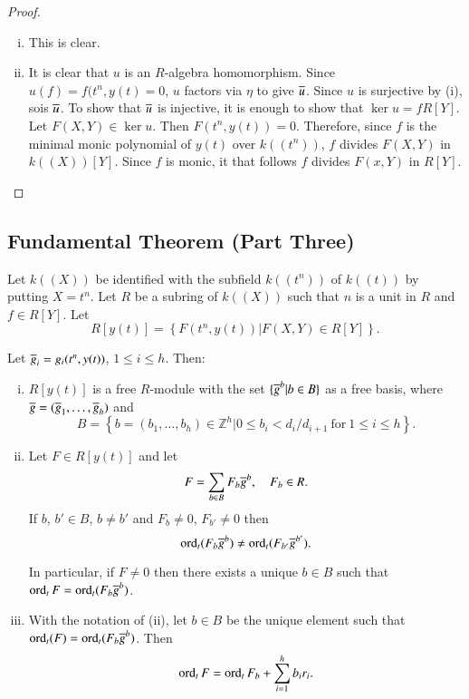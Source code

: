 \begin{proof}
  ~
\begin{enumerate}[(i)]
\item This is clear.
\item It is clear that $u$ is an $R$-algebra homomorphism. Since $u(f) = f(t^n, y(t)=0$, $u$ factors via $\eta$ to give $\overline{u}$. Since $u$ is surjective by (i), so\pageoriginale is $\overline{u}$. To show that $\overline{u}$ is injective, it is enough to show that $\ker u = fR[Y]$. Let $F(X, Y) \in \ker u$. Then $F(t^n, y(t))=0$. Therefore, since $f$ is the minimal monic polynomial of $y(t)$ over $k((t^n))$, $f$ divides $F(X, Y)$ in $k((X)) [Y]$. Since $f$ is monic, it  that follows $f$ divides $F(x, Y)$ in $R[Y]$.
\end{enumerate}
\end{proof}

\setcounter{subsection}{4}
\subsection{Fundamental Theorem (Part Three)}\label{part1:chap3:sec8:ss8.5}

Let $k((X))$ be identified with the subfield $k((t^n))$ of $k((t))$ by putting $X= t^n$. Let $R$ be a subring of $k((X))$ such that $n$ is a unit in $R$ and $f \in R [Y]$. Let
$$
R[y(t)] = \left\{ F(t^n, y(t)) \Big| F(X, Y) \in R[Y]\right\}.
$$

Let $\overline{g}_i= g_i (t^n, y(t))$, $1 \leq i \leq h$. Then:
\begin{enumerate}[(i)]
\item $R[y(t)]$ is a free $R$-module with the set $\{\overline{g}^b| b \in B\}$ as a free basis, where $\overline{g} = (\overline{g}_1, \ldots , \overline{g}_h)$ and 
$$
B= \left\{ b = (b_1 , \ldots , b_h) \in \mathbb{Z}^h \Big| 0 \leq b_i < d_i/d_{i+1} ~\text{for}~ 1\leq i \leq h \right\}.
$$

\item Let $F \in R[y(t)]$ and let
$$
F= \sum_{b \in B} F_b \overline{g}^b, \quad F_b \in R.
$$
If $b$, $b' \in B$, $b \neq b'$ and $F_b \neq 0$, $F_{b'}\neq 0$ then 
$$
\operatorname{ord}_t (F_b \overline{g}^b) \neq \operatorname{ord}_t (F_{b'} \overline{g}^{b'}).
$$

In particular, if $F \neq 0$ then there exists a unique $b \in B$ such that $\operatorname{ord}_t F= \operatorname{ord}_t (F_b \overline{g}^b)$.

\item With the notation of (ii), let $b \in B$ be the unique element such that $\operatorname{ord}_t (F)= \operatorname{ord}_t (F_b \overline{g}^b)$. Then
$$
\operatorname{ord}_t F= \operatorname{ord}_t F_b+ \sum^h_{i=1} b_i r_i.
$$
\end{enumerate}


